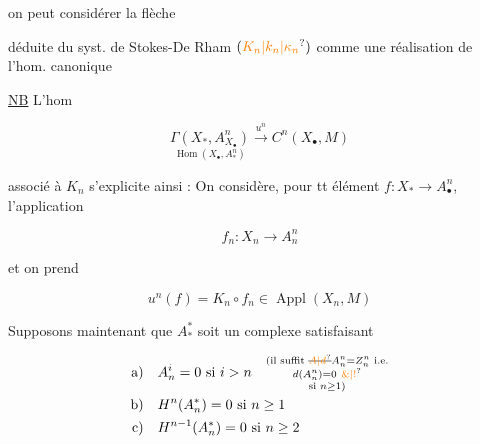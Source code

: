 
on peut considérer la flèche


déduite du syst. de Stokes-De Rham $(\unsure{K_n|k_n|\kappa_n})$ comme une réalisation de l'hom. canonique


 

\uline{NB} L'hom

\[
\underset{\operatorname{Hom}(X_\bullet,A^n_*)}{\Gamma(X_*,A^n_{X_\bullet})}\xrightarrow{u^n} C^n(X_\bullet,M)
\]

associé à $K_n$ s'explicite ainsi : On considère, pour tt élément  $f:X_*\longrightarrow A^n_\bullet$, l'application

\[
f_n:X_n\longrightarrow A^n_n
\]

et on prend

\[
u^n(f)=K_n\circ f_n\in\operatorname{Appl}(X_n,M)
\]

Supposons maintenant que $A_*^*$ soit un complexe satisfaisant

\[
\begin{aligned}
\text{a)}\quad &A^i_n=0\text{ si }i>n
\quad\substack{\text{(il suffit }\deleted{\unsure{A|d}}A^n_n=Z^n_n\text{ i.e.}\\d(A^n_n)=0\ \unsure{\&|!}\\\text{si }n\geq1\text{)}}\\
\text{b)}\quad &H^n(A^*_n)=0\text{ si }n\geq 1\\
\text{c)}\quad &H^{n-1}(A^*_n)=0\text{ si }n\geq 2
\end{aligned}
\]

